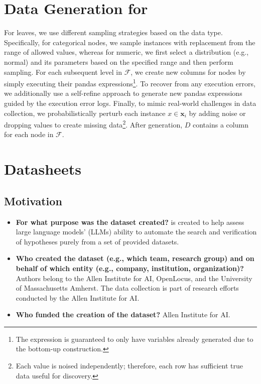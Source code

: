 \section{Data Generation for \synth{}}
\label{sec:synth}
For leaves, we use different sampling strategies based on the data type. 
Specifically, for categorical nodes, we sample instances with replacement from the range of allowed values, whereas for numeric, we first select a distribution (e.g., normal) and its parameters based on the specified range and then perform sampling. 
For each subsequent level in $\mathcal{F}$, we create new columns for nodes by simply executing their pandas expressions\footnote{The expression is guaranteed to only have variables already generated due to the bottom-up construction.}. 
To recover from any execution errors, we additionally use a self-refine \citep{madaan2023selfrefine} approach to generate new pandas expressions guided by the execution error logs. 
Finally, to mimic real-world challenges in data collection, we probabilistically perturb each instance $x \in \mathbf{x}_i$ 
by adding noise or dropping values 
to create missing data\footnote{Each value is noised independently; therefore, each row has sufficient true data useful for discovery.}. 
After generation, $D$ contains a column for each node in $\mathcal{F}$.


\section{Datasheets}
\label{sec:datasheets}

\subsection{Motivation}

\begin{itemize}
    \item \textbf{For what purpose was the dataset created?} \discoverybench{} is created to help assess large language models' (LLMs) ability to automate the search and verification of hypotheses purely from a set of provided datasets.
    \item \textbf{Who created the dataset (e.g., which team, research group) and on behalf of which entity (e.g., company, institution, organization)?} Authors belong to the Allen Institute for AI, OpenLocus, and the University of Massachusetts Amherst. The data collection is part of research efforts conducted by the Allen Institute for AI.
    \item \textbf{Who funded the creation of the dataset?} Allen Institute for AI.
\end{itemize}

